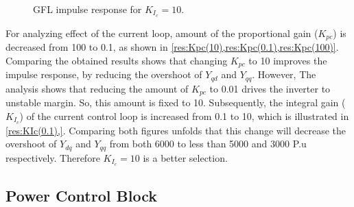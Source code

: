\begin{figure}[ht]
\begin{center}
    \centering
   \nonindent
	\caption[GFL impulse response for $K_I_c=10$]{GFL impulse response for $K_I_c=10$.}
	\label{res:KIc(10)}
	\end{center}
\end{figure}

For analyzing effect of the current loop, amount of the proportional gain ($K_{pc}$) is decreased from 100 to 0.1, as shown in \cref{res:Kpc(10),res:Kpc(0.1),res:Kpc(100)}. Comparing the obtained results  shows that changing $K_{pc}$ to 10 improves the impulse response, by reducing the overshoot of $Y_{qd}$ and $Y_{qq}$. However, The analysis shows that reducing the amount of $K_{pc}$ to 0.01 drives the inverter to unstable margin. So, this amount is fixed to 10. Subsequently, the integral gain ($K_I_c$) of the current control loop is increased from 0.1 to 10, which is illustrated in \cref{res:KIc(0.1),}. Comparing both figures unfolds that this change will decrease the overshoot of $Y_{dq}$ and $Y_{qq}$ from both 6000 to less than 5000 and 3000 P.u respectively. Therefore $K_I_c=10$ is a better selection.

\subsection{Power Control Block}

